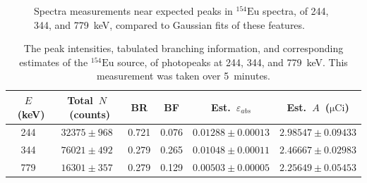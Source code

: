 \documentclass[12pt]{article}
\newcommand{\micCi}{$\mathrm{\mu Ci}$\xspace}
\newcommand{\EuSrc}{$\mathrm{^{154}Eu}$\xspace}
\begin{document}
\begin{figure}
    \centering
    \hfill
    \hfill
    \caption{Spectra measurements near expected peaks in \EuSrc spectra, of 244, 344, and 779~keV, compared to Gaussian fits of these features.}
    \label{fig:peak-fits-Eu}
\end{figure}

\begin{table}[htp!]
    \centering
    \caption{The peak intensities, tabulated branching information, and corresponding estimates of the \EuSrc source, of photopeaks at 244, 344, and 779~keV. This measurement was taken over 5~minutes.}
    \label{tab:eu-act}
    \begin{tabular}{c|c|cc|cc}\hline
$E$~(keV) & Total~$N$~(counts) & BR & BF & Est.~$\varepsilon_{abs}$ & Est.~$A$~(\micCi) \\\hline
244 & $32375 \pm 968$ & 0.721 & 0.076 & $0.01288 \pm 0.00013$ & $2.98547 \pm 0.09433$ \\
344 & $76021 \pm 492$ & 0.279 & 0.265 & $0.01048 \pm 0.00011$ & $2.46667 \pm 0.02983$ \\
779 & $16301 \pm 357$ & 0.279 & 0.129 & $0.00503 \pm 0.00005$ & $2.25649 \pm 0.05453$ \\\hline
    \end{tabular}
\end{table}


\FloatBarrier
\end{document}
